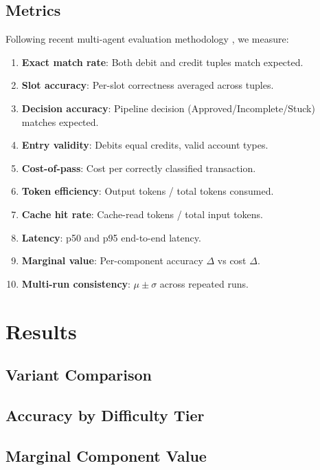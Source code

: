 \documentclass[11pt, a4paper]{article}
\begin{document}
\subsection{Metrics}
Following recent multi-agent evaluation methodology
\cite{multiagentbench2025, efficient-agents2025, financial-benchmark2026},
we measure:
\begin{enumerate}
  \item \textbf{Exact match rate}: Both debit and credit tuples match expected.
  \item \textbf{Slot accuracy}: Per-slot correctness averaged across tuples.
  \item \textbf{Decision accuracy}: Pipeline decision (Approved/Incomplete/Stuck) matches expected.
  \item \textbf{Entry validity}: Debits equal credits, valid account types.
  \item \textbf{Cost-of-pass}: Cost per correctly classified transaction.
  \item \textbf{Token efficiency}: Output tokens / total tokens consumed.
  \item \textbf{Cache hit rate}: Cache-read tokens / total input tokens.
  \item \textbf{Latency}: p50 and p95 end-to-end latency.
  \item \textbf{Marginal value}: Per-component accuracy $\Delta$ vs cost $\Delta$.
  \item \textbf{Multi-run consistency}: $\mu \pm \sigma$ across repeated runs.
\end{enumerate}

\section{Results}

\subsection{Variant Comparison}


\subsection{Accuracy by Difficulty Tier}


\subsection{Marginal Component Value}

\end{document}
